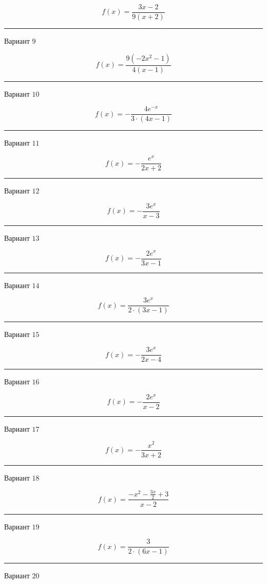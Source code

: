 \documentclass[11pt]{report}
\begin{document}
$$f(x) = \frac{3 x - 2}{9 \left(x + 2\right)}$$
\begin{center}
\noindent\rule{8cm}{0.4pt}
\end{center}
Вариант $9$


$$f(x) = \frac{9 \left(- 2 x^{2} - 1\right)}{4 \left(x - 1\right)}$$
\begin{center}
\noindent\rule{8cm}{0.4pt}
\end{center}
Вариант $10$


$$f(x) = - \frac{4 e^{- x}}{3 \cdot \left(4 x - 1\right)}$$
\begin{center}
\noindent\rule{8cm}{0.4pt}
\end{center}
Вариант $11$


$$f(x) = - \frac{e^{x}}{2 x + 2}$$
\begin{center}
\noindent\rule{8cm}{0.4pt}
\end{center}
Вариант $12$


$$f(x) = - \frac{3 e^{x}}{x - 3}$$
\begin{center}
\noindent\rule{8cm}{0.4pt}
\end{center}
Вариант $13$


$$f(x) = - \frac{2 e^{x}}{3 x - 1}$$
\begin{center}
\noindent\rule{8cm}{0.4pt}
\end{center}
Вариант $14$


$$f(x) = \frac{3 e^{x}}{2 \cdot \left(3 x - 1\right)}$$
\begin{center}
\noindent\rule{8cm}{0.4pt}
\end{center}
Вариант $15$


$$f(x) = - \frac{3 e^{x}}{2 x - 4}$$
\begin{center}
\noindent\rule{8cm}{0.4pt}
\end{center}
Вариант $16$


$$f(x) = - \frac{2 e^{x}}{x - 2}$$
\begin{center}
\noindent\rule{8cm}{0.4pt}
\end{center}
Вариант $17$


$$f(x) = - \frac{x^{2}}{3 x + 2}$$
\begin{center}
\noindent\rule{8cm}{0.4pt}
\end{center}
Вариант $18$


$$f(x) = \frac{- x^{2} - \frac{3 x}{2} + 3}{x - 2}$$
\begin{center}
\noindent\rule{8cm}{0.4pt}
\end{center}
Вариант $19$


$$f(x) = \frac{3}{2 \cdot \left(6 x - 1\right)}$$
\begin{center}
\noindent\rule{8cm}{0.4pt}
\end{center}
Вариант $20$
\end{document}
